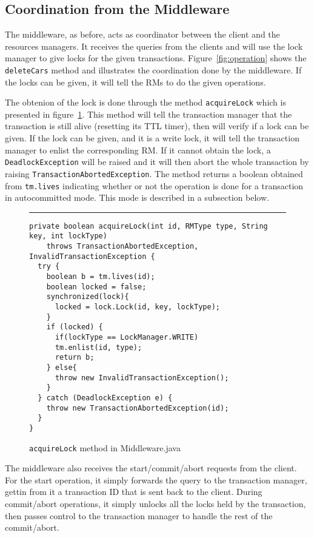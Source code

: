\documentclass[12pt]{article}
\theoremstyle{plain}%
\theoremstyle{definition}
\theoremstyle{remark}
\newcommand{\java}[1]{{\lstinline!#1!}}
\newenvironment{figureone}[1]{%
  \def\deffigurecaption{#1}%
  \begin{figure}[htbp]%
  \begin{center}%
  \begin{minipage}{\columnwidth}%
  \hrule \vspace*{2ex}%
}{%
  \end{minipage}%
  \end{center}%
  \caption{\deffigurecaption}%
  \end{figure}%
}
\begin{document}
\subsection*{Coordination from the Middleware}

The middleware, as before, acts as coordinator between the client and the resources managers. It receives the queries from the clients and will use the lock manager to give locks for the given transactions. Figure~\ref{fig:operation} shows the \java{deleteCars} method and illustrates the coordination done by the middleware. If the locks can be given, it will tell the RMs to do the given operations. 

The obtenion of the lock is done through the method \java{acquireLock} which is presented in figure~\ref{fig:acquireLock}. This method will tell the transaction manager that the transaction is still alive (resetting its TTL timer), then will verify if a lock can be given. If the lock can be given, and it is a write lock, it will tell the transaction manager to enlist the corresponding RM. If it cannot obtain the lock, a \java{DeadlockException} will be raised and it will then abort the whole transaction by raising \java{TransactionAbortedException}. The method returns a boolean obtained from \java{tm.lives} indicating whether or not the operation is done for a transaction in autocommitted mode. This mode is described in a subsection below.

\begin{figureone}{\java{acquireLock} method in Middleware.java \label{fig:acquireLock}}
\begin{lstlisting}
private boolean acquireLock(int id, RMType type, String key, int lockType) 
    throws TransactionAbortedException, InvalidTransactionException {
  try {
    boolean b = tm.lives(id);
    boolean locked = false;
    synchronized(lock){
      locked = lock.Lock(id, key, lockType);
    }
    if (locked) {
      if(lockType == LockManager.WRITE)
      tm.enlist(id, type);
      return b;
    } else{
      throw new InvalidTransactionException();
    }
  } catch (DeadlockException e) {
    throw new TransactionAbortedException(id);
  }
}
\end{lstlisting}
\end{figureone}

The middleware also receives the start/commit/abort requests from the client. For the start operation, it simply forwards the query to the transaction manager, gettin from it a transaction ID that is sent back to the client. During commit/abort operations, it simply unlocks all the locks held by the transaction, then passes control to the transaction manager to handle the rest of the commit/abort.
\end{document}
